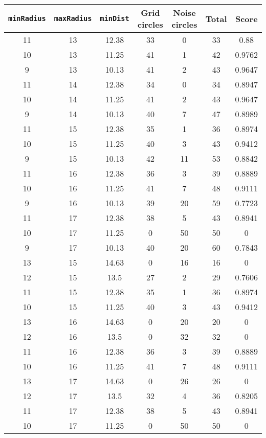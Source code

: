 \documentclass[letterpaper, 12pt]{article}
\begin{document}
\begin{longtable}{|c|c|c|c|c|c|c|}
\hline
\textbf{\texttt{minRadius}} & \textbf{\texttt{maxRadius}} & \textbf{\texttt{minDist}} & \textbf{Grid circles} & \textbf{Noise circles} & \textbf{Total} & \textbf{Score} \\
\hline
11 & 13 & 12.38 & 33 & 0 & 33 & 0.88 \\
\hline
10 & 13 & 11.25 & 41 & 1 & 42 & 0.9762 \\
\hline
9 & 13 & 10.13 & 41 & 2 & 43 & 0.9647 \\
\hline
11 & 14 & 12.38 & 34 & 0 & 34 & 0.8947 \\
\hline
10 & 14 & 11.25 & 41 & 2 & 43 & 0.9647 \\
\hline
9 & 14 & 10.13 & 40 & 7 & 47 & 0.8989 \\
\hline
11 & 15 & 12.38 & 35 & 1 & 36 & 0.8974 \\
\hline
10 & 15 & 11.25 & 40 & 3 & 43 & 0.9412 \\
\hline
9 & 15 & 10.13 & 42 & 11 & 53 & 0.8842 \\
\hline
11 & 16 & 12.38 & 36 & 3 & 39 & 0.8889 \\
\hline
10 & 16 & 11.25 & 41 & 7 & 48 & 0.9111 \\
\hline
9 & 16 & 10.13 & 39 & 20 & 59 & 0.7723 \\
\hline
11 & 17 & 12.38 & 38 & 5 & 43 & 0.8941 \\
\hline
10 & 17 & 11.25 & 0 & 50 & 50 & 0 \\
\hline
9 & 17 & 10.13 & 40 & 20 & 60 & 0.7843 \\
\hline
13 & 15 & 14.63 & 0 & 16 & 16 & 0 \\
\hline
12 & 15 & 13.5 & 27 & 2 & 29 & 0.7606 \\
\hline
11 & 15 & 12.38 & 35 & 1 & 36 & 0.8974 \\
\hline
10 & 15 & 11.25 & 40 & 3 & 43 & 0.9412 \\
\hline
13 & 16 & 14.63 & 0 & 20 & 20 & 0 \\
\hline
12 & 16 & 13.5 & 0 & 32 & 32 & 0 \\
\hline
11 & 16 & 12.38 & 36 & 3 & 39 & 0.8889 \\
\hline
10 & 16 & 11.25 & 41 & 7 & 48 & 0.9111 \\
\hline
13 & 17 & 14.63 & 0 & 26 & 26 & 0 \\
\hline
12 & 17 & 13.5 & 32 & 4 & 36 & 0.8205 \\
\hline
11 & 17 & 12.38 & 38 & 5 & 43 & 0.8941 \\
\hline
10 & 17 & 11.25 & 0 & 50 & 50 & 0 \\

\end{longtable}
\end{document}

